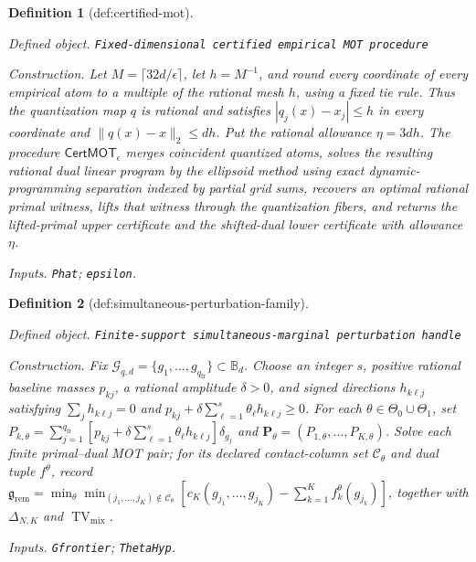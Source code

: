 \documentclass{article}
\newtheorem{definition}{Definition}
\begin{document}
\begin{definition}[def:certified-mot]\label{def:certified-mot}
\par\smallskip\noindent\emph{Defined object.} \texttt{Fixed-\allowbreak{}dimensional certified empirical MOT procedure}
\par\smallskip\noindent\emph{Construction.} Let \(M=\lceil32d/\epsilon\rceil\), let \(h=M^{-1}\), and round every coordinate of every empirical atom to a multiple of the rational mesh \(h\), using a fixed tie rule. Thus the quantization map \(q\) is rational and satisfies \(|q_j(x)-x_j|\le h\) in every coordinate and \(\|q(x)-x\|_2\le dh\). Put the rational allowance \(\eta=3dh\). The procedure \(\mathsf{CertMOT}_\epsilon\) merges coincident quantized atoms, solves the resulting rational dual linear program by the ellipsoid method using exact dynamic-programming separation indexed by partial grid sums, recovers an optimal rational primal witness, lifts that witness through the quantization fibers, and returns the lifted-primal upper certificate and the shifted-dual lower certificate with allowance \(\eta\).
\par\smallskip\noindent\emph{Inputs.} \texttt{Phat}; \texttt{epsilon}.
\end{definition}

\begin{definition}[def:simultaneous-perturbation-family]\label{def:simultaneous-perturbation-family}
\par\smallskip\noindent\emph{Defined object.} \texttt{Finite-\allowbreak{}support simultaneous-\allowbreak{}marginal perturbation handle}
\par\smallskip\noindent\emph{Construction.} Fix \(\mathcal G_{q,d}=\{g_1,\ldots,g_{q_{\mathrm{fr}}}\}\subset\mathbb B_d\). Choose an integer \(s\), positive rational baseline masses \(p_{kj}\), a rational amplitude \(\delta>0\), and signed directions \(h_{k\ell j}\) satisfying \(\sum_jh_{k\ell j}=0\) and \(p_{kj}+\delta\sum_{\ell=1}^s\theta_\ell h_{k\ell j}\ge0\). For each \(\theta\in\Theta_0\cup\Theta_1\), set \(P_{k,\theta}=\sum_{j=1}^{q_{\mathrm{fr}}}[p_{kj}+\delta\sum_{\ell=1}^s\theta_\ell h_{k\ell j}]\delta_{g_j}\) and \(\mathbf P_\theta=(P_{1,\theta},\ldots,P_{K,\theta})\). Solve each finite primal--dual MOT pair; for its declared contact-column set \(\mathcal C_\theta\) and dual tuple \(f^\theta\), record \(\mathfrak g_{\mathrm{rem}}=\min_{\theta}\min_{(j_1,\ldots,j_K)\notin\mathcal C_\theta}[c_K(g_{j_1},\ldots,g_{j_K})-\sum_{k=1}^Kf_k^\theta(g_{j_k})]\), together with \(\Delta_{N,K}\) and \(\operatorname{TV}_{\mathrm{mix}}\).
\par\smallskip\noindent\emph{Inputs.} \texttt{Gfrontier}; \texttt{ThetaHyp}.
\end{definition}
\end{document}
